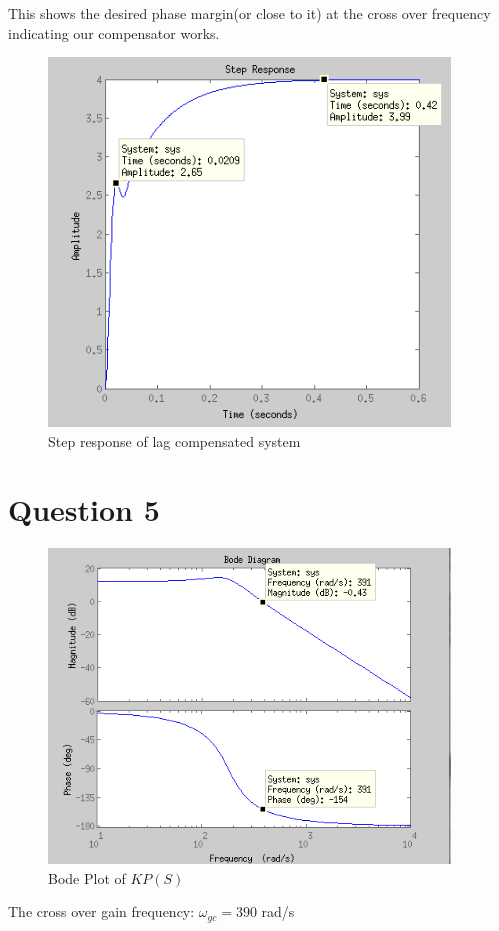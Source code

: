 \documentclass{article}
\begin{document}
This shows the desired phase margin(or close to it) at the cross over frequency indicating our compensator works.

\begin{figure}[!htbp]
    \centering
    \includegraphics[width=0.95\textwidth]{sim_lag_step.png}
    \caption{Step response of lag compensated system}
\end{figure}

\newpage





\section{Question 5} %
\label{sec:question_5}
\begin{figure}[!htbp]
    \centering
    \includegraphics[width=0.95\textwidth]{prop_sys.png}
    \caption{Bode Plot of $KP(S)$}
\end{figure}
The cross over gain frequency: $\omega_{gc} = 390$ rad/s
\end{document}
